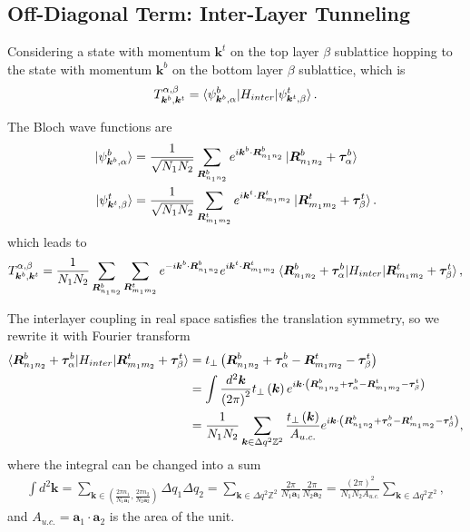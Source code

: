 \documentclass[10pt, oneside]{article}
\newcommand{\p}[1]{\left(#1\right)}
\begin{document}
\subsection{Off-Diagonal Term: Inter-Layer Tunneling}
Considering a state with momentum \(\bm{k}^{t}\) on the top layer \(\beta\) sublattice hopping to the state with momentum \(\bm{k}^b\) on the bottom layer \(\beta\) sublattice, which is  
\begin{align}
	T^{\alpha,\beta}_{\bm{k}^{b},\bm{k}^{t}} = \braket{\psi^{b}_{\bm{k}^{b},\alpha} | H_{inter} | \psi^{t}_{\bm{k}^{t},\beta}}.
\end{align}

The Bloch wave functions are 
\begin{align}
	\ket{\psi^{b}_{\bm{k}^{b},\alpha}}  &= \frac{1}{\sqrt{N_1 N_2}} \sum_{\bm{R}^{b}_{n_1 n_2}} e^{i \bm{k}^{b} \cdot \bm{R}^{b}_{n_1 n_2}} \ket{\bm{R}^{b}_{n_1 n_2} + \bm{\tau}^{b}_{\alpha}} \\
	\ket{\psi^{t}_{\bm{k}^{t} ,\beta}} &= \frac{1}{\sqrt{N_1 N_2}} \sum_{\bm{R}^{t}_{m_1 m_2}} e^{i \bm{k}^{t} \cdot \bm{R}^{t}_{m_1 m_2}} \ket{\bm{R}^{t}_{m_1 m_2} + \bm{\tau}^{t}_{\beta}}.
\end{align}
which leads to 
\begin{align}
	T^{\alpha,\beta}_{\bm{k}^{b},\bm{k}^{t}} = \frac{1}{N_1 N_2} \sum_{\bm{R}^{b}_{n_1 n_2}} \sum_{\bm{R}^{t}_{m_1 m_2}}  e^{- i \bm{k}^{b} \cdot \bm{R}^{b}_{n_1 n_2}} e^{i \bm{k}^{t} \cdot  \bm{R}^{t}_{m_1 m_2}} \braket{\bm{R}^{b}_{n_1 n_2} + \bm{\tau}^{b}_{\alpha}| H_{inter} | \bm{R}^{t}_{m_1 m_2} + \bm{\tau}^{t}_{\beta}},
\end{align} 
 
The interlayer coupling in real space satisfies the translation symmetry, so we rewrite it with Fourier transform
\begin{align}
	\begin{split}
		\braket{\bm{R}^{b}_{n_1 n_2} + \bm{\tau}^{b}_{\alpha}| H_{inter} | \bm{R}^{t}_{m_1 m_2} + \bm{\tau}^{t}_{\beta}} & = t_{\perp} \p{\bm{R}^{b}_{n_1 n_2} + \bm{\tau}^{b}_{\alpha} - \bm{R}^{t}_{m_1 m_2}  - \bm{\tau}^{t}_{\beta}} \\
		& = \int \frac{d^{2} \bm{k}}{\p{2 \pi}^2} t_{\perp}\p{\bm{k}} e^{  i \bm{k} \cdot \p{\bm{R}^{b}_{n_1 n_2} + \bm{\tau}^{b}_{\alpha} - \bm{R}^{t}_{m_1 m_2}  - \bm{\tau}^{t}_{\beta}} }\\
		& =\frac{1}{N_1 N_2} \sum_{\bm{k} \in \Delta q^2 \mathbb{Z}^2} \frac{t_{\perp} \p{\bm{k}}}{A_{u.c.}} e^{  i \bm{k} \cdot \p{\bm{R}^{b}_{n_1 n_2} + \bm{\tau}^{b}_{\alpha} - \bm{R}^{t}_{m_1 m_2}  - \bm{\tau}^{t}_{\beta}} },
	\end{split}
\end{align}
where the integral can be changed into a sum
\begin{align}
	\int d^{2} \bm{k} = \sum_{\bm{k} \in {\p{\frac{2 \pi n_{1}}{N_{1} \bm{a}_{1}}, \frac{2 \pi n_{2}}{N_{2} \bm{a}_{2}}}}} \Delta q_{1} \Delta q_{2} =\sum_{\bm{k} \in \Delta q^2 \mathbb{Z}^2}  \frac{2 \pi}{N_{1} \bm{a}_{1}} \frac{2 \pi}{N_{2} \bm{a}_{2}}=\frac{\p{2 \pi}^2}{N_1 N_2 A_{u.c.} } \sum_{\bm{k} \in \Delta q^2 \mathbb{Z}^2},  
\end{align}
and \(A_{u.c.} = \bm{a}_{1} \cdot \bm{a}_{2}\) is the area of the unit. 
\end{document}
